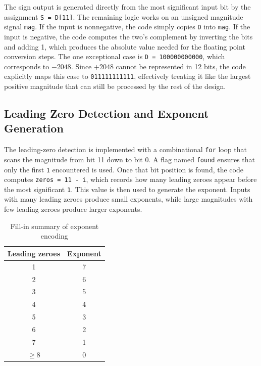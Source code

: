 \documentclass[10pt,letterpaper]{article}
\begin{document}
The sign output is generated directly from the most significant input bit by the assignment \texttt{S = D[11]}. The remaining logic works on an unsigned magnitude signal \texttt{mag}. If the input is nonnegative, the code simply copies \texttt{D} into \texttt{mag}. If the input is negative, the code computes the two's complement by inverting the bits and adding 1, which produces the absolute value needed for the floating point conversion steps. The one exceptional case is \texttt{D = 100000000000}, which corresponds to $-2048$. Since $+2048$ cannot be represented in 12 bits, the code explicitly maps this case to \texttt{011111111111}, effectively treating it like the largest positive magnitude that can still be processed by the rest of the design.

\subsection{Leading Zero Detection and Exponent Generation}

The leading-zero detection is implemented with a combinational \texttt{for} loop that scans the magnitude from bit 11 down to bit 0. A flag named \texttt{found} ensures that only the first \texttt{1} encountered is used. Once that bit position is found, the code computes \texttt{zeros = 11 - i}, which records how many leading zeroes appear before the most significant \texttt{1}. This value is then used to generate the exponent. Inputs with many leading zeroes produce small exponents, while large magnitudes with few leading zeroes produce larger exponents.

\begin{table}[H]
    \centering
    \caption{Fill-in summary of exponent encoding}
    \begin{tabular}{cc}
        \toprule
        Leading zeroes & Exponent \\
        \midrule
        1 & 7 \\
        2 & 6 \\
        3 & 5 \\
        4 & 4 \\
        5 & 3 \\
        6 & 2 \\
        7 & 1 \\
        $\geq 8$ & 0 \\
        \bottomrule
    \end{tabular}
    \label{tab:exp-map}
\end{table}
\end{document}
